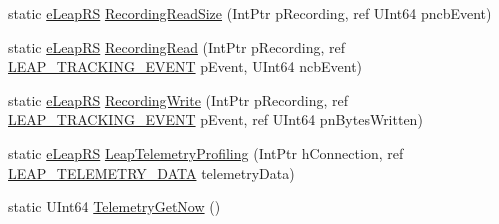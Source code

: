 \begin{DoxyCompactItemize}
\item 
static \mbox{\hyperlink{namespace_leap_internal_ae50b07d24c508b84273392b6dcbea1d9}{e\+Leap\+RS}} \mbox{\hyperlink{class_leap_internal_1_1_leap_c_ad882a574cac8bf2608c780390c9b77b3}{Recording\+Read\+Size}} (Int\+Ptr p\+Recording, ref U\+Int64 pncb\+Event)
\item 
static \mbox{\hyperlink{namespace_leap_internal_ae50b07d24c508b84273392b6dcbea1d9}{e\+Leap\+RS}} \mbox{\hyperlink{class_leap_internal_1_1_leap_c_af4b4e7cdc79f5f72df507cfbb6b31f94}{Recording\+Read}} (Int\+Ptr p\+Recording, ref \mbox{\hyperlink{struct_leap_internal_1_1_l_e_a_p___t_r_a_c_k_i_n_g___e_v_e_n_t}{L\+E\+A\+P\+\_\+\+T\+R\+A\+C\+K\+I\+N\+G\+\_\+\+E\+V\+E\+NT}} p\+Event, U\+Int64 ncb\+Event)
\item 
static \mbox{\hyperlink{namespace_leap_internal_ae50b07d24c508b84273392b6dcbea1d9}{e\+Leap\+RS}} \mbox{\hyperlink{class_leap_internal_1_1_leap_c_aeca4b745c2d299d8315077c5d047ce43}{Recording\+Write}} (Int\+Ptr p\+Recording, ref \mbox{\hyperlink{struct_leap_internal_1_1_l_e_a_p___t_r_a_c_k_i_n_g___e_v_e_n_t}{L\+E\+A\+P\+\_\+\+T\+R\+A\+C\+K\+I\+N\+G\+\_\+\+E\+V\+E\+NT}} p\+Event, ref U\+Int64 pn\+Bytes\+Written)
\item 
static \mbox{\hyperlink{namespace_leap_internal_ae50b07d24c508b84273392b6dcbea1d9}{e\+Leap\+RS}} \mbox{\hyperlink{class_leap_internal_1_1_leap_c_a8c04b0435063d992e7fba8815547fa5e}{Leap\+Telemetry\+Profiling}} (Int\+Ptr h\+Connection, ref \mbox{\hyperlink{struct_leap_internal_1_1_l_e_a_p___t_e_l_e_m_e_t_r_y___d_a_t_a}{L\+E\+A\+P\+\_\+\+T\+E\+L\+E\+M\+E\+T\+R\+Y\+\_\+\+D\+A\+TA}} telemetry\+Data)
\item 
static U\+Int64 \mbox{\hyperlink{class_leap_internal_1_1_leap_c_a415ed5d4673719ca1d3ed8c133416693}{Telemetry\+Get\+Now}} ()
\end{DoxyCompactItemize}

